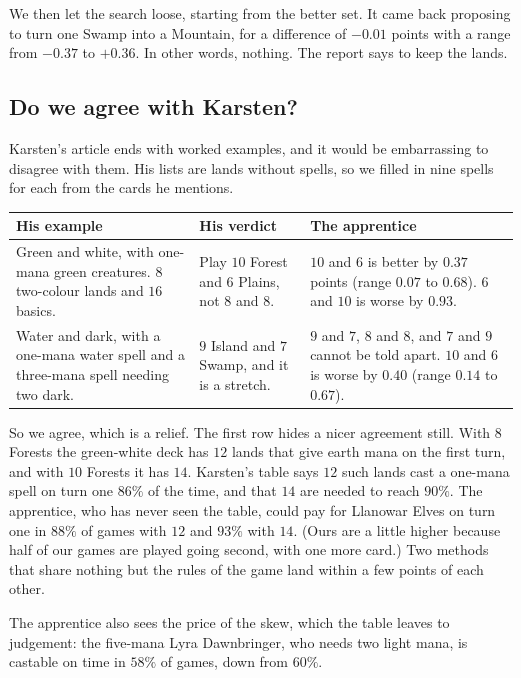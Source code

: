 \documentclass[
    a4paper,
    DIV=13,
    abstract=true,
    numbers=noenddot
]{scrartcl}
\begin{document}
We then let the search loose, starting from the better set. It came back proposing to turn one Swamp into a Mountain, for a difference of $-0.01$ points with a range from $-0.37$ to $+0.36$. In other words, nothing. The report says to keep the lands.

\subsection{Do we agree with Karsten?}
Karsten's article \cite{karsten2018sources} ends with worked examples, and it would be embarrassing to disagree with them. His lists are lands without spells, so we filled in nine spells for each from the cards he mentions.
\begin{center}
\begin{tabular}{p{}p{}p{}}
\toprule
His example & His verdict & The apprentice\\
\midrule
Green and white, with one-mana green creatures. $8$ two-colour lands and $16$ basics. & Play $10$ Forest and $6$ Plains, not $8$ and $8$. & $10$ and $6$ is better by $0.37$ points (range $0.07$ to $0.68$). $6$ and $10$ is worse by $0.93$.\\
\addlinespace
Water and dark, with a one-mana water spell and a three-mana spell needing two dark. & $9$ Island and $7$ Swamp, and it is a stretch. & $9$ and $7$, $8$ and $8$, and $7$ and $9$ cannot be told apart. $10$ and $6$ is worse by $0.40$ (range $0.14$ to $0.67$).\\
\bottomrule
\end{tabular}
\end{center}
So we agree, which is a relief. The first row hides a nicer agreement still. With $8$ Forests the green-white deck has $12$ lands that give earth mana on the first turn, and with $10$ Forests it has $14$. Karsten's table says $12$ such lands cast a one-mana spell on turn one $86\%$ of the time, and that $14$ are needed to reach $90\%$. The apprentice, who has never seen the table, could pay for Llanowar Elves on turn one in $88\%$ of games with $12$ and $93\%$ with $14$. (Ours are a little higher because half of our games are played going second, with one more card.) Two methods that share nothing but the rules of the game land within a few points of each other.

The apprentice also sees the price of the skew, which the table leaves to judgement: the five-mana Lyra Dawnbringer, who needs two light mana, is castable on time in $58\%$ of games, down from $60\%$.
\end{document}
